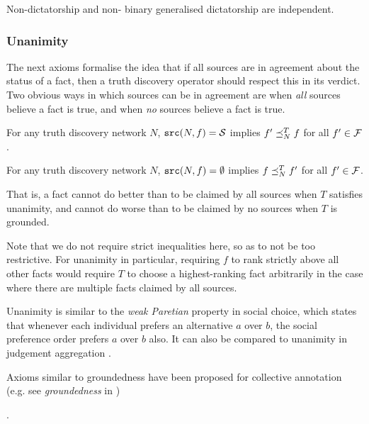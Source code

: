 \documentclass[../main.tex]{subfiles}
\begin{document}
\begin{proposition}
\label{prop:non_dict_and_non_bin_gen_dict_indep}
Non-dictatorship and non- binary generalised dictatorship are independent.
\end{proposition}

\subsubsection{Unanimity}

The next axioms formalise the idea that if all sources are in agreement about
the status of a fact, then a truth discovery operator should respect this in
its verdict. Two obvious ways in which sources can be in agreement are when
\emph{all} sources believe a fact is true, and when \emph{no} sources believe a
fact is true.

\begin{axiom}[Unanimity]
\label{axiom:unanimity}
For any truth discovery network $N$, $\texttt{src}(N, f) = \mathcal{S}$ implies $f' \preceq_N^T f$
for all $f' \in \mathcal{F}$.
\end{axiom}

\begin{axiom}[Groundedness]
\label{axiom:groundedness}
For any truth discovery network $N$, $\texttt{src}(N, f) = \emptyset$ implies $f
\preceq_N^T f'$ for all $f' \in \mathcal{F}$.
\end{axiom}

That is, a fact cannot do better than to be claimed by all sources when $T$
satisfies unanimity, and cannot do worse than to be claimed by no sources when
$T$ is grounded.

Note that we do not require strict inequalities here, so as to not be too
restrictive. For unanimity in particular, requiring $f$ to rank strictly above
all other facts would require $T$ to choose a highest-ranking fact arbitrarily
in the case where there are multiple facts claimed by all sources.

Unanimity is similar to the \emph{weak Paretian} property \cite{handbook_intro}
in social choice, which states that whenever each individual prefers an
alternative $a$ over $b$, the social preference order prefers $a$ over $b$
also. It can also be compared to unanimity in judgement
aggregation \cite{handbook_ja}.

Axioms similar to groundedness have been proposed for collective annotation
(e.g. see \emph{groundedness} in \cite{kruger})

.
\end{document}
